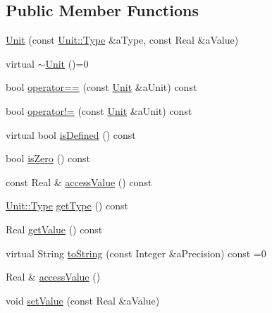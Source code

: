 \subsection*{Public Member Functions}
\begin{DoxyCompactItemize}
\item 
\hyperlink{classlibrary_1_1physics_1_1units_1_1_unit_a52369bb8717bfe8d04d7dcb992903208}{Unit} (const \hyperlink{classlibrary_1_1physics_1_1units_1_1_unit_a828bc1b6ad6fa5cbef904ea0fede986a}{Unit\+::\+Type} \&a\+Type, const Real \&a\+Value)
\item 
virtual \hyperlink{classlibrary_1_1physics_1_1units_1_1_unit_a6c50741e149602a9fecf3b45100463a0}{$\sim$\+Unit} ()=0
\item 
bool \hyperlink{classlibrary_1_1physics_1_1units_1_1_unit_ad7b6273fa1232ff0d26f98c2af39d183}{operator==} (const \hyperlink{classlibrary_1_1physics_1_1units_1_1_unit}{Unit} \&a\+Unit) const
\item 
bool \hyperlink{classlibrary_1_1physics_1_1units_1_1_unit_a68d7c6e97c9748b43b55b5f74e0f9cda}{operator!=} (const \hyperlink{classlibrary_1_1physics_1_1units_1_1_unit}{Unit} \&a\+Unit) const
\item 
virtual bool \hyperlink{classlibrary_1_1physics_1_1units_1_1_unit_a5ce011c1ffa0fce4cf1f5d42ff06ee78}{is\+Defined} () const
\item 
bool \hyperlink{classlibrary_1_1physics_1_1units_1_1_unit_a034d99479240b780ab15dbc9eec629f0}{is\+Zero} () const
\item 
const Real \& \hyperlink{classlibrary_1_1physics_1_1units_1_1_unit_a836f37ccb8db8220064f6718d3236f32}{access\+Value} () const
\item 
\hyperlink{classlibrary_1_1physics_1_1units_1_1_unit_a828bc1b6ad6fa5cbef904ea0fede986a}{Unit\+::\+Type} \hyperlink{classlibrary_1_1physics_1_1units_1_1_unit_a4f4e6ba62e833324970a06c29685488a}{get\+Type} () const
\item 
Real \hyperlink{classlibrary_1_1physics_1_1units_1_1_unit_ab6541add236a0c2e5bbfb4b5b35126fb}{get\+Value} () const
\item 
virtual String \hyperlink{classlibrary_1_1physics_1_1units_1_1_unit_aac05cb6ed1ea7c18c233a3381c81caf8}{to\+String} (const Integer \&a\+Precision) const =0
\item 
Real \& \hyperlink{classlibrary_1_1physics_1_1units_1_1_unit_a73cd28e6cae2cd36ab65bdeaf9814e8f}{access\+Value} ()
\item 
void \hyperlink{classlibrary_1_1physics_1_1units_1_1_unit_a0d61125a36ae706eb4800564fb7c5e54}{set\+Value} (const Real \&a\+Value)
\end{DoxyCompactItemize}


